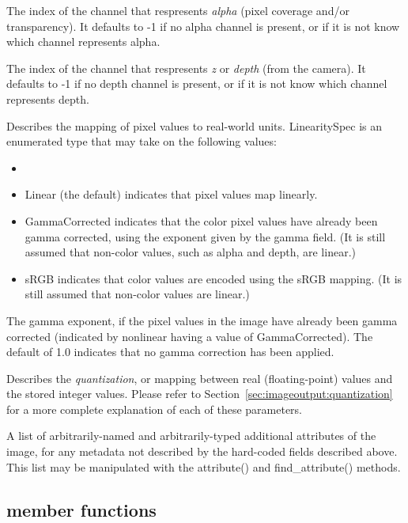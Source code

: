 The index of the channel that respresents \emph{alpha} (pixel coverage
and/or transparency).  It defaults to -1 if no alpha channel is present,
or if it is not know which channel represents alpha.
\apiend

The index of the channel that respresents \emph{z} or \emph{depth} (from
the camera).  It defaults to -1 if no depth channel is present, or if it
is not know which channel represents depth.
\apiend

Describes the mapping of pixel values to real-world units.  
{\kw LinearitySpec} is
an enumerated type that may take on the following values:
\begin{itemize}
\item[] 
\item {\kw Linear} (the default) indicates that pixel values map
  linearly.
\item {\kw GammaCorrected} indicates that the color pixel values have
  already been gamma corrected, using the exponent given by the {\kw
    gamma} field.  (It is still assumed that non-color values, such as
  alpha and depth, are linear.)
\item {\kw sRGB} indicates that color values are encoded using the sRGB
  mapping.  (It is still assumed that non-color values are linear.)
\end{itemize}
\apiend

The gamma exponent, if the pixel values in the image have already been
gamma corrected (indicated by {\kw nonlinear} having a value of {\kw
GammaCorrected}).  The default of 1.0 indicates that no gamma
correction has been applied.
\apiend

Describes the \emph{quantization}, or mapping between real
(floating-point) values and the stored integer values.
Please refer to Section~\ref{sec:imageoutput:quantization} for
a more complete explanation of each of these parameters.
\apiend

A list of arbitrarily-named and arbitrarily-typed additional attributes
of the image, for any metadata not described by the hard-coded fields
described above.  This list may be manipulated with the {\kw
attribute()} and {\kw find_attribute()} methods.
\apiend

\subsection{\ImageSpec member functions}

